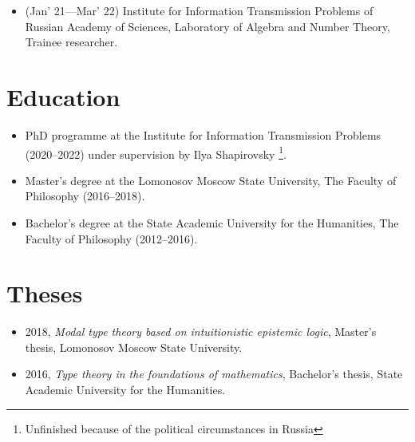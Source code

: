 \documentclass[10pt,a4paper]{article}
\begin{document}
\begin{itemize}[leftmargin=*]
\begin{itemize}[leftmargin=*]
    \item (2018) Cardano, a cryptocurrency backend in Haskell.
    \item (2019) Machine Learning in Haskell, an R\&D project on type-safe matrix operations via singletons. The work on that project also included the preparation of blogposts and the conference talk.
    \item (2019) Formality, an R\&D project, a dependently typed language with affine types.
    \item (2020--2022) Glasgow Haskell Compiler contribution: the implementation of the Char Kind and partial implementation of @-binders in function declarations.
    \end{itemize}
    \item (Jan' 21---Mar' 22) Institute for Information Transmission Problems of Russian Academy of Sciences, Laboratory of Algebra and Number Theory, Trainee researcher.
\end{itemize}

\section{Education}

\begin{itemize}[leftmargin=*]
    \item PhD programme at the Institute for Information Transmission Problems (2020--2022) under supervision by Ilya Shapirovsky \footnote{Unfinished because of the political circumstances in Russia}.
    \item Master's degree at the Lomonosov Moscow State University, The Faculty of Philosophy (2016--2018).
    \item Bachelor's degree at the State Academic University for the Humanities, The Faculty of Philosophy (2012--2016).
\end{itemize}

\section{Theses}

\begin{itemize}[leftmargin=*]
    \item 2018, \textit{Modal type theory based on intuitionistic epistemic logic}, Master's thesis, Lomonosov Moscow State University.
    \item 2016, \textit{Type theory in the foundations of mathematics}, Bachelor's thesis, State Academic University for the Humanities.
\end{itemize}
\end{document}
